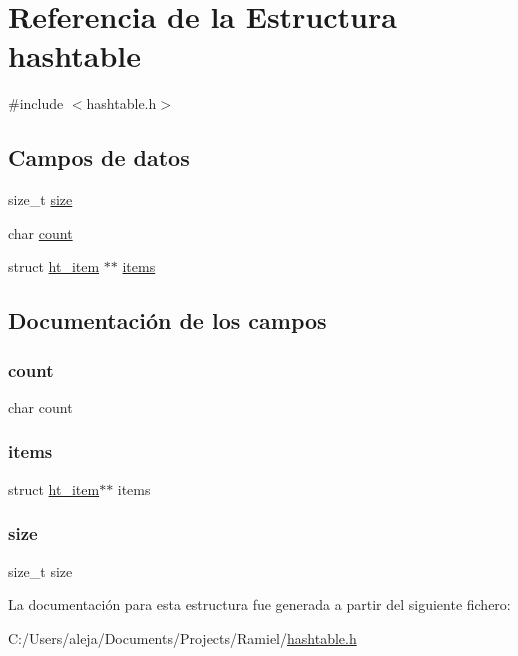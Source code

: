 \hypertarget{structhashtable}{}\section{Referencia de la Estructura hashtable}
\label{structhashtable}


{\ttfamily \#include $<$hashtable.\+h$>$}

\subsection*{Campos de datos}
\begin{DoxyCompactItemize}
\item 
size\+\_\+t \mbox{\hyperlink{structhashtable_a854352f53b148adc24983a58a1866d66}{size}}
\item 
char \mbox{\hyperlink{structhashtable_a783b4b3f28a47e4200d0cd5522f99009}{count}}
\item 
struct \mbox{\hyperlink{structht__item}{ht\+\_\+item}} $\ast$$\ast$ \mbox{\hyperlink{structhashtable_a8a3d7e001ac614584cad5d1ed7f83881}{items}}
\end{DoxyCompactItemize}


\subsection{Documentación de los campos}
\mbox{\label{structhashtable_a783b4b3f28a47e4200d0cd5522f99009}} 
\subsubsection{\texorpdfstring{count}{count}}
{\footnotesize\ttfamily char count}

\mbox{\label{structhashtable_a8a3d7e001ac614584cad5d1ed7f83881}} 
\subsubsection{\texorpdfstring{items}{items}}
{\footnotesize\ttfamily struct \mbox{\hyperlink{structht__item}{ht\+\_\+item}}$\ast$$\ast$ items}

\mbox{\label{structhashtable_a854352f53b148adc24983a58a1866d66}} 
\subsubsection{\texorpdfstring{size}{size}}
{\footnotesize\ttfamily size\+\_\+t size}



La documentación para esta estructura fue generada a partir del siguiente fichero\+:\begin{DoxyCompactItemize}
\item 
C\+:/\+Users/aleja/\+Documents/\+Projects/\+Ramiel/\mbox{\hyperlink{hashtable_8h}{hashtable.\+h}}\end{DoxyCompactItemize}

